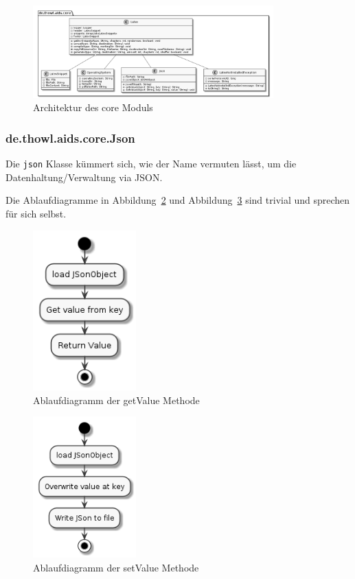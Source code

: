 \documentclass[stu, a4paper, 11pt, floatsintext]{apa7}
\begin{document}
\begin{figure}[!htbp]
\centering
\includegraphics[width=350px]{../technical_documentation/diagramm/uml/flowcharts/core/core.png}
\caption{\label{Core Architektur}Architektur des core Moduls}
\end{figure}

\subsubsection{de.thowl.aids.core.Json}
\noindent Die \texttt{json} Klasse kümmert sich, wie der Name vermuten lässt, um die Datenhaltung/Verwaltung via JSON.

Die Ablaufdiagramme in Abbildung~\ref{getValue-methode} und Abbildung~\ref{setValue-methode} sind trivial und sprechen für sich selbst.

\begin{figure}[!htbp]
\centering
\includegraphics[width=150px]{../technical_documentation/diagramm/uml/flowcharts/core/json/getValue.png}
\caption{\label{getValue-methode}Ablaufdiagramm der getValue Methode}
\end{figure}

\begin{figure}[!htbp]
\centering
\includegraphics[width=150px]{../technical_documentation/diagramm/uml/flowcharts/core/json/setValue.png}
\caption{\label{setValue-methode}Ablaufdiagramm der setValue Methode}
\end{figure}
\end{document}
